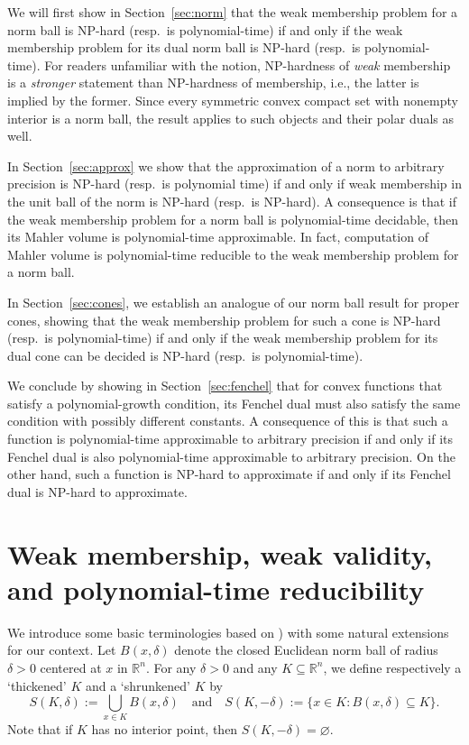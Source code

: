 \documentclass[11pt,reqno]{amsart}
\theoremstyle{definition}
\theoremstyle{remark}
\begin{document}
We will first show in Section~\ref{sec:norm}  that the weak membership problem for a norm ball is NP-hard (resp.\ is polynomial-time) if and only if the weak membership problem for its dual norm ball is NP-hard (resp.\ is polynomial-time). For readers unfamiliar with the notion, NP-hardness of \emph{weak} membership is a \emph{stronger} statement than NP-hardness of membership, i.e., the latter is implied by the former. Since every symmetric convex compact set with nonempty interior is a norm ball, the result applies to such objects and their polar duals as well.

In Section~\ref{sec:approx} we show that the approximation of a norm to arbitrary precision is NP-hard (resp.\ is polynomial time) if and only if  weak membership  in the unit ball of the norm is NP-hard (resp.\ is NP-hard).  A consequence is that if the weak membership problem for a norm ball is polynomial-time decidable, then its Mahler volume is polynomial-time approximable. In fact, computation of Mahler volume is polynomial-time reducible to the weak membership problem for a norm ball.

In Section~\ref{sec:cones}, we establish an analogue of our norm ball result for proper cones, showing that  the weak membership problem for such a cone  is NP-hard (resp.\ is polynomial-time) if and only if the weak membership problem for its dual cone can be decided is NP-hard (resp.\ is polynomial-time).

We conclude by showing in Section~\ref{sec:fenchel} that for convex functions that satisfy a polynomial-growth condition, its Fenchel dual must also satisfy the same condition with possibly different constants. A consequence of this is that such a function is polynomial-time approximable to arbitrary precision if and only if its Fenchel dual is also  polynomial-time approximable to arbitrary precision. On the other hand, such a function is NP-hard to approximate if and only if its Fenchel dual is NP-hard to approximate.

\section{Weak membership, weak validity, and polynomial-time reducibility}\label{sec:weak}

We introduce some basic terminologies based on \cite[Chapter~2]{GLS88}) with some natural extensions for our context. 
Let $B(x,\delta)$ denote the closed Euclidean norm ball of radius $\delta > 0$ centered at $x$ in $\mathbb{R}^n$.
For any $\delta>0$ and any $K \subseteq \mathbb{R}^n$,  we define respectively a `thickened' $K$ and a `shrunkened' $K$ by
\begin{equation}\label{eq:thick-shrunk}
S(K,\delta):=\bigcup_{x\in K} B(x,\delta)\quad \text{and}\quad S(K,-\delta):=\{x\in K: B(x,\delta)\subseteq K\}.
\end{equation}
Note that if $K$ has no interior point, then $S(K,-\delta) = \varnothing$.
\end{document}
